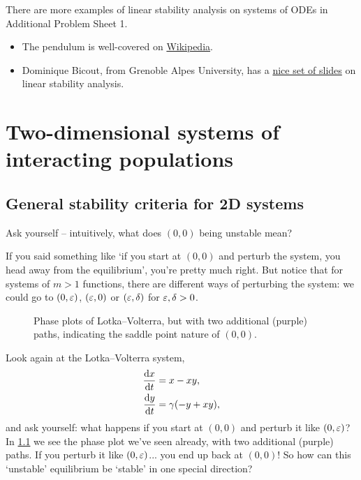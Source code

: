 \documentclass[main.tex]{subfiles}
\begin{document}
\begin{do-it-yourself}
There are more examples of linear stability analysis on systems of ODEs in Additional Problem Sheet 1.
\end{do-it-yourself}

\begin{extra-reading}
\begin{itemize}
	\item The pendulum is well-covered on \href{https://en.wikipedia.org/wiki/Pendulum_(mathematics)}{Wikipedia}.
	\item Dominique Bicout, from Grenoble Alpes University, has a \href{https://web.archive.org/web/20200110091156/http://www-sante.ujf-grenoble.fr/SANTE/cms/sites/medatice/dcem1/dcem1/docs/20131209160534/Bicout_Modelisation_M1_2013.pdf}{nice set of slides} on linear stability analysis.
	\end{itemize}
\end{extra-reading}



\chapter{Two-dimensional systems of interacting populations}\label{complotvol}

\section{General stability criteria for 2D systems}
\label{sec:gen-stability-criteria}

Ask yourself -- intuitively, what does $(0,0)$ being unstable mean?

If you said something like `if you start at $(0,0)$ and perturb the system, you head away from the equilibrium', you're pretty much right. But notice that for systems of $m>1$ functions, there are different ways of perturbing the system: we could go to $(0,\varepsilon)$, $(\varepsilon,0)$ or $(\varepsilon,\delta)$ for $\varepsilon,\delta>0$.

\begin{figure}
	\centering
	
	\caption{Phase plots of Lotka--Volterra, but with two additional (purple) paths, indicating the saddle point nature of $(0,0)$.}
	\label{fig:lv3-phase}
\end{figure}

Look again at the Lotka--Volterra system,
\begin{subequations}\label{lotvol3}
\begin{align}
\fd{x}{t} &= x - xy,\\
\fd{y}{t} &= \gamma(-y + xy),
\end{align}
\end{subequations}
and ask yourself: what happens if you start at $(0,0)$ and perturb it like $(0,\varepsilon)$? In \cref{fig:lv3-phase} we see the phase plot we've seen already, with two additional (purple) paths. If you perturb it like $(0,\varepsilon)$... you end up back at $(0,0)$! So how can this `unstable' equilibrium be `stable' in one special direction?
\end{document}
